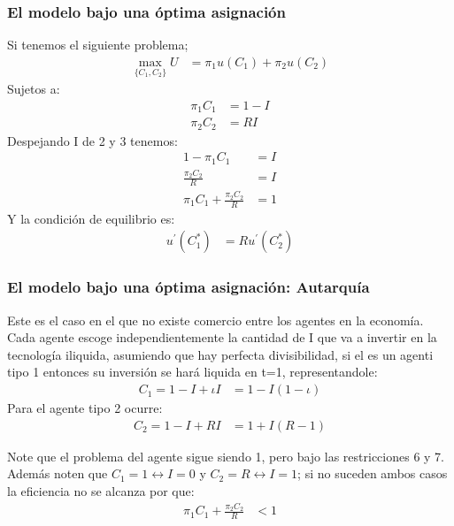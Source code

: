 \documentclass[10pt, xcolor=table, x11names]{beamer}
\begin{document}
\begin{frame}
    \frametitle{{\normalsize El modelo bajo una óptima asignación } {}}
    
    Si tenemos el siguiente problema;
   \begin{align}
   \max_{\{C_{1},C_{2}\}}U&=\pi_{1}u(C_{1})+\pi_{2}u(C_{2})
   \end{align}
   Sujetos a:
   \begin{align}
   \pi_{1}C_{1}&=1-I\\
   \pi_{2}C_{2}&=RI
   \end{align}
   Despejando I de 2 y 3 tenemos:
   \begin{align}
   1-\pi_{1}C_{1}&=I\nonumber\\
   \frac{\pi_{2}C_{2}}{R}&=I\nonumber\\
   \pi_{1}C_{1}+\frac{\pi_{2}C_{2}}{R}&=1
   \end{align}
   Y la condición de equilibrio es:
   \begin{align}
   u^{'}(C_{1}^{*})&=Ru^{'}(C_{2}^{*})
   \end{align}
\end{frame}

\begin{frame}
    \frametitle{{\normalsize El modelo bajo una óptima asignación: Autarquía } {}}
   Este es el caso en el que no existe comercio entre los agentes en la economía. Cada agente escoge independientemente la cantidad de I que va a invertir en la tecnología iliquida, asumiendo que hay perfecta divisibilidad, si el es un agenti tipo 1 entonces su inversión se hará liquida en t=1, representandole:  \\
    \begin{align}
    C_{1}=1-I+\iota I&=1-I(1-\iota)
    \end{align}
   Para el agente tipo 2 ocurre:
   \begin{align}
   C_{2}=1-I+R I&=1+I(R-1)
   \end{align}
   
 Note que el problema del agente sigue siendo 1, pero bajo las restricciones 6 y 7.\\
 Además noten que $C_{1}=1\longleftrightarrow I=0$ y $C_{2}=R\longleftrightarrow I=1$; si no suceden ambos casos la eficiencia no se alcanza por que:
 \begin{align}
 \pi_{1}C_{1}+\frac{\pi_{2}C_{2}}{R}&<1
 \end{align}
 
 
\end{frame}
\end{document}
